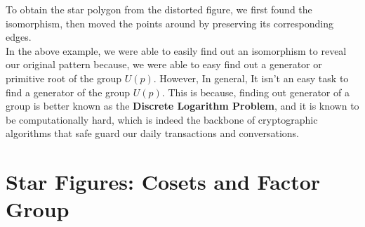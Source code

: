 \documentclass{article}
\begin{document}

To obtain the star polygon from the distorted figure, we first found the isomorphism, then moved the points around by preserving its corresponding edges.\\[2mm]
In the above example, we were able to easily find out an isomorphism to reveal our original pattern because, we were able to easy find out a generator or primitive root of the group $U(p)$. However, In general, It isn't an easy task to find a generator of the group $U(p)$. This is because, finding out generator of a group is better known as the \textbf{Discrete Logarithm Problem}, and it is known to be computationally hard, which is indeed the backbone of cryptographic algorithms that safe guard our daily transactions and conversations.

\section{Star Figures: Cosets and Factor Group}
\end{document}
